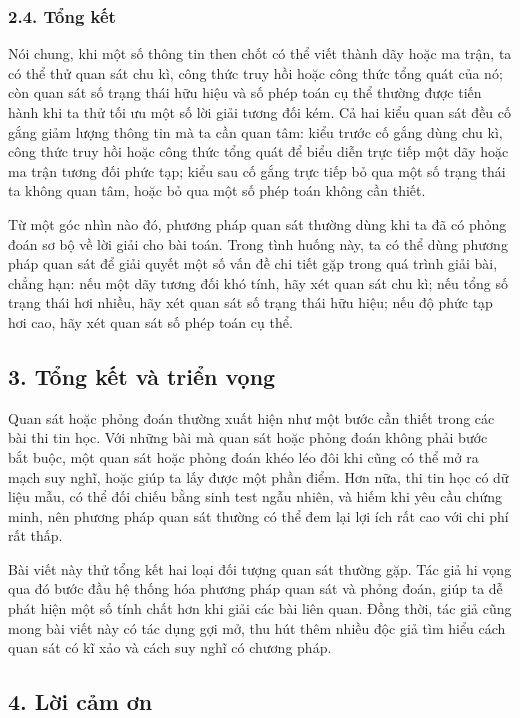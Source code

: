 \documentclass[11pt]{article}
\begin{document}
\subsubsection*{2.4. Tổng kết}

Nói chung, khi một số thông tin then chốt có thể viết thành dãy hoặc ma trận,
ta có thể thử quan sát chu kì, công thức truy hồi hoặc công thức tổng quát của
nó; còn quan sát số trạng thái hữu hiệu và số phép toán cụ thể thường được
tiến hành khi ta thử tối ưu một số lời giải tương đối kém. Cả hai kiểu quan
sát đều cố gắng giảm lượng thông tin mà ta cần quan tâm: kiểu trước cố gắng
dùng chu kì, công thức truy hồi hoặc công thức tổng quát để biểu diễn trực
tiếp một dãy hoặc ma trận tương đối phức tạp; kiểu sau cố gắng trực tiếp bỏ
qua một số trạng thái ta không quan tâm, hoặc bỏ qua một số phép toán không
cần thiết.

Từ một góc nhìn nào đó, phương pháp quan sát thường dùng khi ta đã có phỏng
đoán sơ bộ về lời giải cho bài toán. Trong tình huống này, ta có thể dùng
phương pháp quan sát để giải quyết một số vấn đề chi tiết gặp trong quá trình
giải bài, chẳng hạn: nếu một dãy tương đối khó tính, hãy xét quan sát chu kì;
nếu tổng số trạng thái hơi nhiều, hãy xét quan sát số trạng thái hữu hiệu; nếu
độ phức tạp hơi cao, hãy xét quan sát số phép toán cụ thể.

\subsection*{3. Tổng kết và triển vọng}

Quan sát hoặc phỏng đoán thường xuất hiện như một bước cần thiết trong các bài
thi tin học. Với những bài mà quan sát hoặc phỏng đoán không phải bước bắt
buộc, một quan sát hoặc phỏng đoán khéo léo đôi khi cũng có thể mở ra mạch suy
nghĩ, hoặc giúp ta lấy được một phần điểm. Hơn nữa, thi tin học có dữ liệu mẫu,
có thể đối chiếu bằng sinh test ngẫu nhiên, và hiếm khi yêu cầu chứng minh,
nên phương pháp quan sát thường có thể đem lại lợi ích rất cao với chi phí rất
thấp.

Bài viết này thử tổng kết hai loại đối tượng quan sát thường gặp. Tác giả hi
vọng qua đó bước đầu hệ thống hóa phương pháp quan sát và phỏng đoán, giúp ta
dễ phát hiện một số tính chất hơn khi giải các bài liên quan. Đồng thời, tác
giả cũng mong bài viết này có tác dụng gợi mở, thu hút thêm nhiều độc giả tìm
hiểu cách quan sát có kĩ xảo và cách suy nghĩ có chương pháp.

\subsection*{4. Lời cảm ơn}
\end{document}
